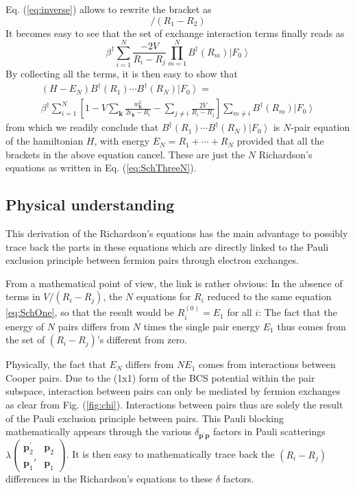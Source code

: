 \documentclass[aps,prb,superscriptaddress,showpacs,reprint,lengthcheck]{revtex4-1}
\newcommand{\vk}{\ensuremath{\mathbf{k}}}
\newcommand{\vp}{\ensuremath{\mathbf{p}}}
\begin{document}
Eq. (\ref{eq:inverse}) allows to rewrite the bracket as 
\begin{equation}
[B^\dagger(R_1)-B^\dagger(R_2)]/(R_1-R_2)
\end{equation}
It becomes easy to see that the set of exchange interaction terms finally reads as 
\begin{equation}
\beta^\dagger\sum_{i=1}^N\frac{-2V}{R_i-R_j}\prod_{m=1}^NB^\dagger(R_m)\left|F_0\right> 
\end{equation}
By collecting all the terms, it is then easy to show that 
\begin{multline}  
(H-E _N)B^{\dagger}(R_1)\cdots{}B^{\dagger}(R_N)\left|F_0%
\right>  = \\
\beta^\dagger\sum_{i=1}^N[1-V\sum_\vk\frac{w_{\mathbf{k} }^2}{2\epsilon_{\mathbf{k}}-R_i}-\sum_{j\neq{}i}\frac{2V%
}{R_i-R_j}]\sum_{m\neq{i}}B^{\dagger}(R_m)\left|F_0\right>  
\end{multline}
from which we readily conclude that $B^{\dagger}(R_1)\cdots{}B^{\dagger}(R_N)\left|F_0\right> $ is $N$-pair equation of the hamiltonian $H$, with energy $E_N=R_1+\cdots+R_N$ provided that all the brackets in the above equation cancel. These are just the $N$ Richardson's equations as written in Eq. (\ref{eq:SchThreeN}). 

\subsection{Physical understanding}

This  derivation of the Richardson's equations has the main advantage to
possibly trace back the parts in these equations which are directly linked
to the Pauli exclusion principle between fermion pairs through electron exchanges. 

From a mathematical point of view, the link is rather obvious: In the
absence of terms in $V/(R_i-R_j)$, the $N$ equations for $R_i$ reduced to
the same equation \eqref{eq:SchOne}, so that the result would be $R^{(0)}_i=%
E _1$ for all $i$: The fact that the energy of $N$ pairs differs
from $N$ times the single pair energy $E_1$ thus comes from the set of $(R_i-R_j)$'s
different from zero.

Physically, the fact that $E _N$ differs from $NE _1$
comes from interactions between Cooper pairs. Due to the (1x1) form of the BCS
potential within the pair subspace, interaction between pairs can only be mediated by fermion
exchanges as clear from Fig. (\ref{fig:chi}). 
Interactions between pairs thus
are solely the result of the Pauli exclusion principle between pairs. This
Pauli blocking mathematically appears through the various $\delta_{\mathbf{p}
^{\prime}\mathbf{p} }$ factors in Pauli scatterings $\lambda(%
\begin{smallmatrix}\vp^\prime_2&\vp_2\\\vp_1'&\vp_1\end{smallmatrix})  $. It
is then easy to mathematically trace back the $(R_i-R_j)$ differences
 in the Richardson's equations to these $\delta$ factors.
\end{document}
